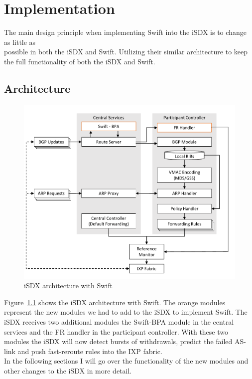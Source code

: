 \chapter{\label{chapter3}Implementation}


The main design principle when implementing Swift into the iSDX is to change as little as \\ 
possible in both the iSDX and Swift. Utilizing their similar architecture to keep the full functionality of both the iSDX and Swift.

\section{\label{chapter3:Architecture}Architecture}

\begin{figure}[h]
\center
\includegraphics[scale = 0.7]{Figures/design_sdx_swift_cropped.pdf}
\caption{iSDX architecture with Swift}
\label{fig:isdx_architecture_with_swift}
\end{figure}

Figure~\ref{fig:isdx_architecture_with_swift} shows the iSDX architecture with Swift. The orange modules represent the new modules we had to add to the iSDX to implement Swift. The iSDX receives two additional modules the Swift-BPA module in the central services and the FR handler in the participant controller. With these two modules the iSDX will now detect bursts of withdrawals, predict the failed AS-link and push fast-reroute rules into the IXP fabric. \\
In the following sections I will go over the functionality of the new modules and other changes to the iSDX in more detail.


